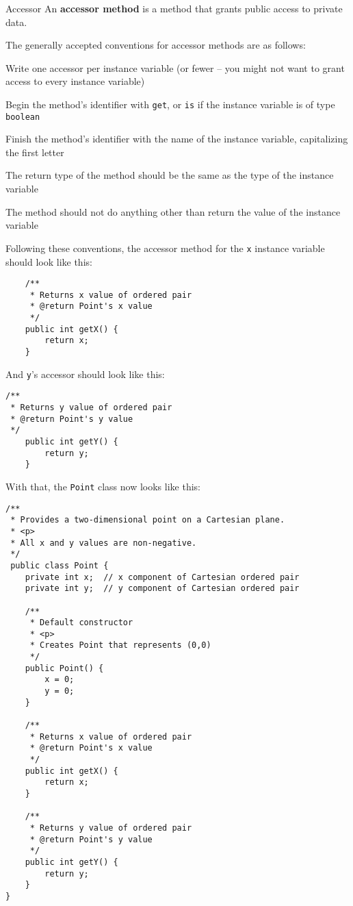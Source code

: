 \begin{defn}{Accessor}
    An \textbf{accessor method} is a method that grants public access to private data.
\end{defn}

The generally accepted conventions for accessor methods are as follows:
\bi
\item Write one accessor per instance variable (or fewer -- you might not want to grant access to every instance variable)
\item Begin the method's identifier with \texttt{get}, or \texttt{is} if the instance variable is of type \texttt{boolean}
\item Finish the method's identifier with the name of the instance variable, capitalizing the first letter
\item The return type of the method should be the same as the type of the instance variable
\item The method should not do anything other than return the value of the instance variable
\ei

Following these conventions, the accessor method for the \texttt{x} instance variable should look like this:

\begin{verbatim}
    /**
     * Returns x value of ordered pair
     * @return Point's x value
     */
    public int getX() {
        return x;
    }
\end{verbatim}

And \texttt{y}'s accessor should look like this:

\begin{verbatim}
/**
 * Returns y value of ordered pair
 * @return Point's y value
 */
    public int getY() {
        return y;
    }
\end{verbatim}

With that, the \texttt{Point} class now looks like this:

\begin{verbatim}
/**
 * Provides a two-dimensional point on a Cartesian plane.
 * <p>
 * All x and y values are non-negative.
 */
 public class Point {
    private int x;  // x component of Cartesian ordered pair
    private int y;  // y component of Cartesian ordered pair

    /**
     * Default constructor
     * <p>
     * Creates Point that represents (0,0)
     */
    public Point() {
        x = 0;
        y = 0;
    }

    /**
     * Returns x value of ordered pair
     * @return Point's x value
     */
    public int getX() {
        return x;
    }

    /**
     * Returns y value of ordered pair
     * @return Point's y value
     */
    public int getY() {
        return y;
    }
}
\end{verbatim}

